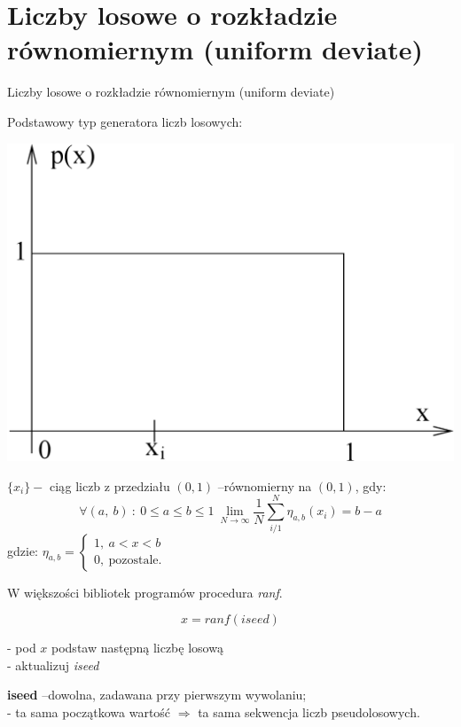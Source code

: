 ﻿\section{Liczby losowe o rozkładzie równomiernym (uniform deviate)}
	\begin{frame}{Liczby losowe o rozkładzie równomiernym (uniform deviate)}
	

	Podstawowy typ generatora liczb losowych:
	\begin{center}
	\includegraphics[scale=0.15]{img/14/14_2_img}
	\end{center}
    \end{frame}
    
    \begin{frame}
    \begin{exampleblock}{}
	$\{x_{i}\}-$ ciąg liczb z przedziału $(0,1)$ --równomierny na $(0,1)$, gdy:
	$$
	\forall(a,\ b)\ :\ 0\leq a\leq b\leq 1\ \lim_{N\rightarrow\infty}\frac{1}{N}\sum_{i/1}^{N}\eta_{a,b}		(x_{i})=b-a
	$$
	gdzie: $\eta_{a,b}=\left\{\begin{array}{l}
	1,\ a<x<b\\
	0,\ \mathrm{p}\mathrm{o}\mathrm{z}\mathrm{o}\mathrm{s}\mathrm{t}\mathrm{a}\mathrm{l}\mathrm{e}.
	\end{array}\right.$
	\end{exampleblock}
	W większości bibliotek programów procedura \textit{ranf}.
    	
            \[
            	x = ranf(iseed)
            \]
 
	- pod $x$ podstaw następną liczbę losową \\
    - aktualizuj \textit{iseed}

	\textbf{iseed} --dowolna, zadawana przy pierwszym wywolaniu; \\
	- ta sama początkowa wartość $\Rightarrow$ ta sama sekwencja liczb pseudolosowych.
	\end{frame}